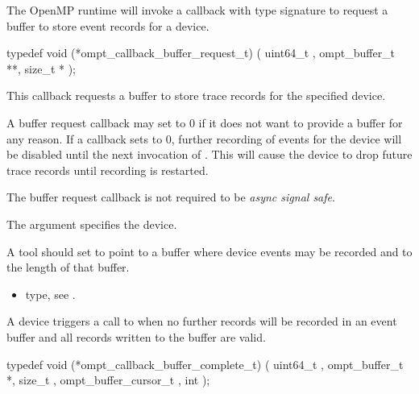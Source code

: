 \label{sec:ompt_callback_buffer_request_t}

\summary
The OpenMP runtime will invoke a callback with type signature
 to request a
buffer to store event records for a device.

\format

\begin{ccppspecific}
\begin{omptCallback}
typedef void (*ompt_callback_buffer_request_t) (
  uint64_t ,
  ompt_buffer_t **,
  size_t *
);
\end{omptCallback}
\end{ccppspecific}


\descr
This callback requests a buffer to store trace records for the
specified device.

A buffer request callback may set  to 0 if it does not
want to provide a buffer for any reason. If a callback sets
 to 0, further recording of events for the device will be
disabled until the next invocation of .  This
will cause the device to drop future trace records until recording is
restarted.

The buffer request callback is not required to be \emph{async signal safe}.

\argdesc

The argument  specifies the device.

A tool should set  to point to a buffer where device events
may be recorded and  to the length of that buffer.

\crossreferences
\begin{itemize}
\item {} type, see
.
\end{itemize}

\label{sec:ompt_callback_buffer_complete_t}
\summary
A device triggers a call to  when no further records will be recorded in an event buffer and all records written to the buffer are valid.

\format

\begin{ccppspecific}
\begin{omptCallback}
typedef void (*ompt_callback_buffer_complete_t) (
  uint64_t ,
  ompt_buffer_t *,
  size_t ,
  ompt_buffer_cursor_t ,
  int 
);
\end{omptCallback}
\end{ccppspecific}


